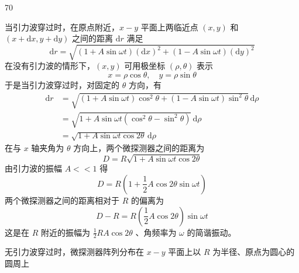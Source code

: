 \begin{solution}{70}
    \begin{subsolution}
        \begin{subsubsolution}
            当引力波穿过时，在原点附近，$x-y$ 平面上两临近点 $(x,y)$ 和 $(x+\mathrm{d}x,y+\mathrm{d}y)$ 之间的距离 $\mathrm{d}r$ 满足
            \begin{equation}
                \mathrm{d}r = \sqrt{(1 + A\sin\omega t)(\mathrm{d}x)^{2} + (1 - A\sin\omega t)(\mathrm{d}y)^{2}} \label{eq:1.p70}
            \end{equation}
            在没有引力波的情形下，$(x,y)$ 可用极坐标 $(\rho,\theta)$ 表示
            \begin{equation}
                x = \rho\cos\theta,\quad y = \rho\sin\theta \label{eq:2.p70}
            \end{equation}
            于是当引力波穿过时，对固定的 $\theta$ 方向，有
            \begin{align}
                \mathrm{d}r &= \sqrt{(1 + A\sin\omega t)\cos^{2}\theta + (1 - A\sin\omega t)\sin^{2}\theta}\,\mathrm{d}\rho \nonumber \\
                &= \sqrt{1 + A\sin\omega t(\cos^{2}\theta - \sin^{2}\theta)}\,\mathrm{d}\rho \nonumber \\
                &= \sqrt{1 + A\sin\omega t\cos 2\theta}\,\mathrm{d}\rho \label{eq:3.p70}
            \end{align}
            在与 $x$ 轴夹角为 $\theta$ 方向上，两个微探测器之间的距离为
            \begin{equation}
                D = R\sqrt{1 + A\sin\omega t\cos 2\theta} \label{eq:4.p70}
            \end{equation}
            由引力波的振幅 $A << 1$ 得
            \begin{equation}
                D = R\left(1 + \frac{1}{2}A\cos 2\theta\sin\omega t\right) \label{eq:5.p70}
            \end{equation}
            两个微探测器之间的距离相对于 $R$ 的偏离为
            \begin{equation}
                D - R = R\left(\frac{1}{2}A\cos 2\theta\right)\sin\omega t \label{eq:6.p70}
            \end{equation}
            这是在 $R$ 附近的振幅为 $\frac{1}{2}RA\cos 2\theta$ 、角频率为 $\omega$ 的简谐振动。
        \end{subsubsolution}
        \begin{subsubsolution}
            无引力波穿过时，微探测器阵列分布在 $x-y$ 平面上以 $R$ 为半径、原点为圆心的圆周上

\end{subsubsolution}
\end{subsolution}
\end{solution}

